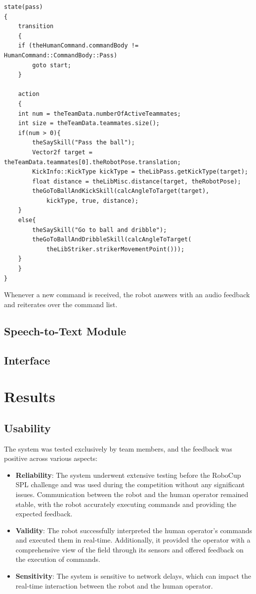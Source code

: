 \documentclass[a4paper, onecolumn, 12pt]{article}
\begin{document}
\begin{verbatim}
state(pass)
{
    transition
    {
    if (theHumanCommand.commandBody != HumanCommand::CommandBody::Pass)
        goto start;
    }

    action
    {
    int num = theTeamData.numberOfActiveTeammates;
    int size = theTeamData.teammates.size();
    if(num > 0){
        theSaySkill("Pass the ball");
        Vector2f target = theTeamData.teammates[0].theRobotPose.translation;
        KickInfo::KickType kickType = theLibPass.getKickType(target);
        float distance = theLibMisc.distance(target, theRobotPose);
        theGoToBallAndKickSkill(calcAngleToTarget(target), 
            kickType, true, distance);
    }
    else{
        theSaySkill("Go to ball and dribble");
        theGoToBallAndDribbleSkill(calcAngleToTarget(
            theLibStriker.strikerMovementPoint()));
    }
    }
}
\end{verbatim}

Whenever a new command is received, the robot answers with an audio feedback and
reiterates over the command list. 


\subsection{Speech-to-Text Module}


\subsection{Interface}


\section{Results}
\label{sec:res}
\subsection{Usability}  
The system was tested exclusively by team members, and the feedback was positive 
across various aspects:  
\begin{itemize}  
    \item \textbf{Reliability}: The system underwent extensive testing before the RoboCup 
    SPL challenge and was used during the competition without any significant issues. 
    Communication between the robot and the human operator remained stable, with the 
    robot accurately executing commands and providing the expected feedback.  
    \item \textbf{Validity}: The robot successfully interpreted the human operator's 
    commands and executed them in real-time. Additionally, it provided the operator with a comprehensive view of the field through its sensors and offered feedback on the execution of commands.  
    \item \textbf{Sensitivity}: The system is sensitive to network delays, which can 
    impact the real-time interaction between the robot and the human operator.  
\end{itemize}  
\end{document}
